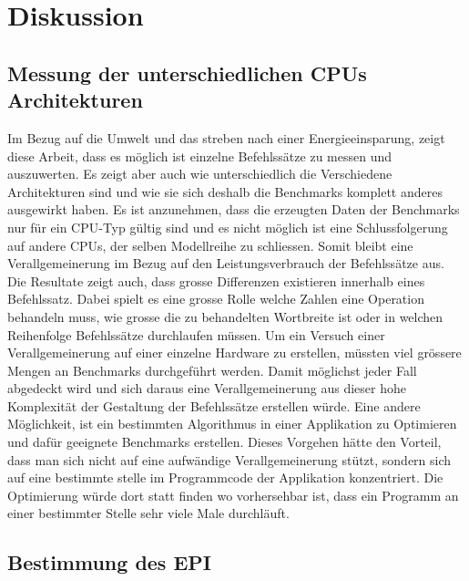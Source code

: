 \chapter{Diskussion}


\section{Messung der unterschiedlichen CPUs Architekturen}
Im Bezug auf die Umwelt und das streben nach einer Energieeinsparung, zeigt diese Arbeit, dass es möglich ist einzelne Befehlssätze zu messen und auszuwerten. Es zeigt aber auch wie unterschiedlich die Verschiedene Architekturen sind und wie sie sich deshalb die Benchmarks komplett anderes ausgewirkt haben. Es ist anzunehmen, dass die erzeugten Daten der Benchmarks nur für ein CPU-Typ gültig sind und es nicht möglich ist eine Schlussfolgerung auf andere CPUs, der selben Modellreihe zu schliessen. Somit bleibt eine Verallgemeinerung im Bezug auf den Leistungsverbrauch der Befehlssätze aus. Die Resultate zeigt auch, dass grosse Differenzen existieren innerhalb eines Befehlssatz. Dabei spielt es eine grosse Rolle welche Zahlen eine Operation behandeln muss, wie grosse die zu behandelten Wortbreite ist oder in welchen Reihenfolge Befehlssätze durchlaufen müssen. Um ein Versuch einer Verallgemeinerung auf einer einzelne Hardware zu erstellen, müssten viel grössere Mengen an Benchmarks durchgeführt werden. Damit möglichst jeder Fall abgedeckt wird und sich daraus eine Verallgemeinerung aus dieser hohe Komplexität der Gestaltung der Befehlssätze erstellen würde. Eine andere Möglichkeit, ist ein bestimmten Algorithmus in einer Applikation zu Optimieren und dafür geeignete Benchmarks erstellen. Dieses Vorgehen hätte den Vorteil, dass man sich nicht auf eine aufwändige Verallgemeinerung stützt, sondern sich auf eine bestimmte stelle im Programmcode der Applikation konzentriert. Die Optimierung würde dort statt finden wo vorhersehbar ist, dass ein Programm an einer bestimmter Stelle sehr viele Male durchläuft.

\section{Bestimmung des EPI}
\label{sec:bestimmung_grundenergie}

